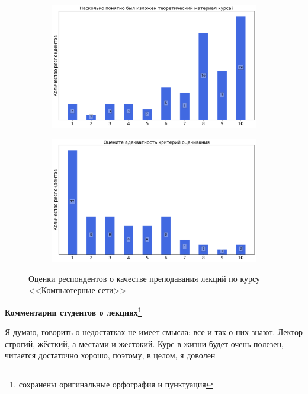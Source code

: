\begin{figure}[H]
\begin{subfigure}[b]{0.45\textwidth}
			\end{subfigure}
			\begin{subfigure}[b]{0.45\textwidth}
				\centering
				\includegraphics[width=\textwidth]{images/3 course/Компьютерные сети/lecturer-marks-Климанов М.М.-2.png}
			\end{subfigure}
			\begin{subfigure}[b]{0.45\textwidth}
				\centering
				\includegraphics[width=\textwidth]{images/3 course/Компьютерные сети/lecturer-marks-Климанов М.М.-3.png}
			\end{subfigure}
			\caption{Оценки респондентов о качестве преподавания лекций по курсу <<Компьютерные сети>>}
		\end{figure}

		\textbf{Комментарии студентов о лекциях\protect\footnote{сохранены оригинальные орфография и пунктуация}}
            \begin{commentbox} 
                Я думаю, говорить о недостатках не имеет смысла: все и так о них знают. Лектор строгий, жёсткий, а местами и жестокий. Курс в жизни будет очень полезен, читается достаточно хорошо, поэтому, в целом, я доволен 
            \end{commentbox} 
        
